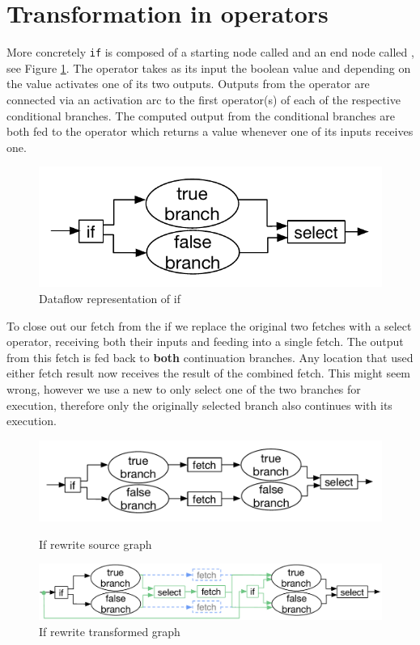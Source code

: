 \section{Transformation in operators}

More concretely \texttt{if} is composed of a starting node called \opite{} and an end node called \opselect{}, see Figure \ref{fig:basic-if}.
The \opite{} operator takes as its input the boolean value and depending on the value activates one of its two outputs.
Outputs from the \opite{} operator are connected via an activation arc to the first operator(s) of each of the respective conditional branches.
The computed output from the conditional branches are both fed to the \opselect{} operator which returns a value whenever one of its inputs receives one.

\begin{figure}
	\includegraphics[width=\textwidth]{Figures/basic-if}
	\caption{Dataflow representation of if}
	\label{fig:basic-if}
\end{figure}

To close out our fetch from the if we replace the original two fetches with a select operator, receiving both their inputs and feeding into a single fetch.
The output from this fetch is fed back to \textbf{both} continuation branches.
Any location that used either fetch result now receives the result of the combined fetch.
This might seem wrong, however we use a new \opite{} to only select one of the two branches for execution, therefore only the originally selected branch also continues with its execution.

\begin{figure}
	\includegraphics[width=\textwidth]{Figures/basic-if-rewrite-original}
	\caption{If rewrite source graph}
	\label{fig:if-rewrite-graph-before}
	\includegraphics[width=\textwidth]{Figures/basic-if-rewrite}
	\caption{If rewrite transformed graph}
	\label{fig:if-rewrite-graph-after}
\end{figure}









